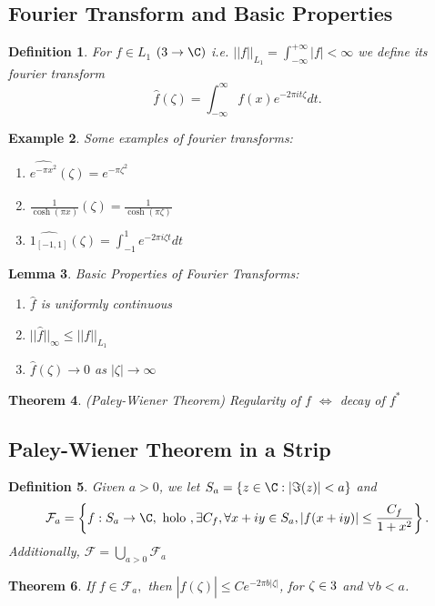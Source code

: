 \documentclass[a4paper]{article}
\newtheorem{thm}{Theorem}[section]
\newtheorem{lem}[thm]{Lemma}
\newtheorem{defn}[thm]{Definition}
\newtheorem{eg}[thm]{Example}
\begin{document}
\subsection{Fourier Transform and Basic Properties}
\begin{defn}
    For $f\in L_1$ $(\R\to \C)$ i.e. $||f||_{L_1}=\int_{-\infty}^{+\infty} |f|<\infty$ we define its fourier transform 
    \[
        \hat{f}(\zeta)=\int_{-\infty}^{\infty} f(x)e^{-2\pi i t \zeta}dt \tag{$\zeta\in \R$}
    .\]  
\end{defn}
\begin{eg}
    Some examples of fourier transforms:
    \begin{enumerate}
        \item $\widehat{e^{-\pi x^2}}(\zeta)=e^{-\pi \zeta^2}$
        \item $\widehat{ \frac{1}{\cosh(\pi x)}}(\zeta)= \frac{1}{\cosh(\pi \zeta)}$
        \item $\widehat{1_{[-1,1]}}(\zeta)= \int_{-1}^1 e^{-2\pi i \zeta t}dt$
    \end{enumerate}
\end{eg}
\begin{lem}
    Basic Properties of Fourier Transforms:
    \begin{enumerate}
        \item $\hat{f}$ is uniformly continuous
        \item $||\hat{f}||_{\infty}\leq ||f||_{L_1}$
        \item $\hat{f}(\zeta)\to 0$ as $|\zeta|\to \infty$ 
    \end{enumerate}
\end{lem}
\begin{thm}
    (Paley-Wiener Theorem) Regularity of $f$ $\iff$ decay of $f^*$
\end{thm}
\subsection{Paley-Wiener Theorem in a Strip}
\begin{defn}
    Given $a>0$, we let $S_a= \{z\in \C: |\Im(z)|<a\}$ and 
    \[
    \mathcal{F}_a= \left \{f: S_a\to \C, \text{ holo }, \exists C_f, \forall x+iy\in S_a, |f(x+iy)|\leq \frac{C_f}{1+x^2}\right \}
    .\] 
    Additionally, $\mathcal{F}=\bigcup_{a>0}\mathcal{F}_a$
\end{defn}

\begin{thm}\label{thm:paley-wiener-decay}
    If $f\in \mathcal{F}_a,$ then $|\hat{f}(\zeta)|\leq C e^{-2\pi b |\zeta|}$, for $\zeta\in 3$ and $\forall b<a$. 
\end{thm}
\end{document}
